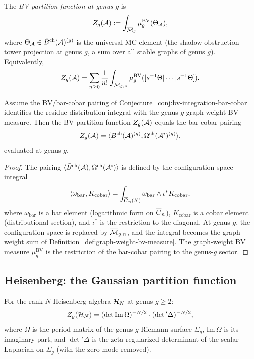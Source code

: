 \begin{definition}
The \emph{BV partition function at genus $g$} is
\begin{equation}
Z_g(\mathcal{A}) := \int_{\overline{\mathcal{M}}_g} \mu^{\mathrm{BV}}_g(\Theta_{\mathcal{A}}),
\end{equation}
where $\Theta_{\mathcal{A}} \in \bar{B}^{\mathrm{ch}}(\mathcal{A})^{(g)}$ is the universal MC element
(the shadow obstruction tower projection at genus $g$, a sum over all stable graphs
of genus $g$). Equivalently,
\[
Z_g(\mathcal{A})
 = \sum_{n \geq 0} \frac{1}{n!}
 \int_{\overline{\mathcal{M}}_{g,n}}
 \mu^{\mathrm{BV}}_g([s^{-1}\Theta | \cdots | s^{-1}\Theta]).
\]
\end{definition}

\begin{proposition}
Assume the BV/bar-cobar pairing of
Conjecture~\ref{conj:bv-integration-bar-cobar} identifies the
residue-distribution integral with the genus-$g$ graph-weight BV
measure. Then the BV partition function $Z_g(\mathcal{A})$ equals the
bar-cobar pairing
\[
Z_g(\mathcal{A}) = \langle \bar{B}^{\mathrm{ch}}(\mathcal{A})^{(g)},
 \Omega^{\mathrm{ch}}(\mathcal{A}^i)^{(g)} \rangle,
\]
evaluated at genus $g$.
\end{proposition}

\begin{proof}
The pairing $\langle \bar{B}^{\mathrm{ch}}(\mathcal{A}), \Omega^{\mathrm{ch}}(\mathcal{A}^i) \rangle$ is defined
by the configuration-space integral
\[
\langle \omega_{\mathrm{bar}}, K_{\mathrm{cobar}} \rangle
 = \int_{\overline{C}_n(X)} \omega_{\mathrm{bar}} \wedge \iota^* K_{\mathrm{cobar}},
\]
where $\omega_{\mathrm{bar}}$ is a bar element (logarithmic form on
$\overline{C}_n$), $K_{\mathrm{cobar}}$ is a cobar element (distributional
section), and $\iota^*$ is the restriction to the diagonal. At genus
$g$, the configuration space is replaced by $\overline{\mathcal{M}}_{g,n}$, and the
integral becomes the graph-weight sum of
Definition~\ref{def:graph-weight-bv-measure}. The graph-weight BV measure
$\mu^{\mathrm{BV}}_g$ is the restriction of the bar-cobar pairing to
the genus-$g$ sector.
\end{proof}

\subsection{Heisenberg: the Gaussian partition function}

\begin{theorem}
For the rank-$N$ Heisenberg algebra $\mathcal{H}_N$ at genus $g \geq 2$:
\[
Z_g(\mathcal{H}_N)
 = (\det \mathrm{Im}\, \Omega)^{-N/2}
 \cdot (\det{}' \Delta)^{-N/2},
\]
where $\Omega$ is the period matrix of the genus-$g$ Riemann surface
$\Sigma_g$, $\mathrm{Im}\, \Omega$ is its imaginary part, and
$\det{}' \Delta$ is the zeta-regularized determinant of the scalar
Laplacian on $\Sigma_g$ (with the zero mode removed).
\end{theorem}


